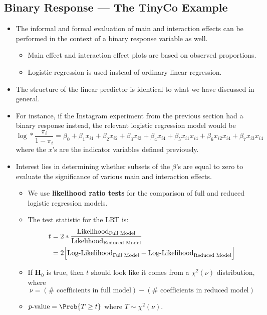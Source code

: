 \subsection{Binary Response --- The TinyCo Example}
\begin{itemize}
      \item The informal and formal evaluation of main and interaction effects can be performed in the context of
            a binary response variable as well.
            \begin{itemize}
                  \item Main effect and interaction effect plots are based on observed proportions.
                  \item Logistic regression is used instead of ordinary linear regression.
            \end{itemize}
      \item The structure of the linear predictor is identical to what we have discussed in general.
      \item For instance, if the Instagram experiment from the previous section had a binary response instead, the
            relevant logistic regression model would be
            \[ \log*{\frac{\pi_i}{1-\pi_i}}=\beta_0+\beta_1x_{i1}+\beta_2x_{i2}+\beta_3x_{i3}+\beta_4x_{i4}+\beta_5x_{i1}x_{i4}+\beta_6x_{i2}x_{i4}+\beta_7x_{i3}x_{i4} \]
            where the $ x $'s are the indicator variables defined previously.
      \item Interest lies in determining whether subsets of the $ \beta $'s are equal to zero to evaluate the significance of
            various main and interaction effects.
            \begin{itemize}
                  \item We use \textbf{likelihood ratio tests} for the comparison of full and reduced logistic regression models.
                  \item The test statistic for the LRT is:
                        \begin{align*}
                              t & =2\log*{\frac{\text{Likelihood}_{\text{Full Model}}}{\text{Likelihood}_{\text{Reduced Model}}}}      \\
                                & =2\Bigl[\text{Log-Likelihood}_{\text{Full Model}}-\text{Log-Likelihood}_{\text{Reduced Model}}\Bigr]
                        \end{align*}
                  \item If $ \mathbf{H}_0 $ is true, then $ t $ should look like it comes from a $ \chi^2(\nu) $ distribution, where
                        \[ \nu=(\#\text{ coefficients in full model})-(\#\text{ coefficients in reduced model}) \]
                  \item $ p\text{-value}=\Prob{T\ge t} $ where $ T \sim \chi^2(\nu) $.
            \end{itemize}
\end{itemize}
